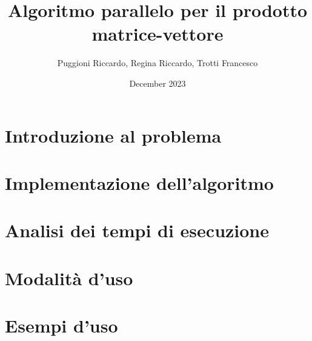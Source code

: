 \documentclass{article}
\title{Algoritmo parallelo per il prodotto matrice-vettore}
\author{Puggioni Riccardo, Regina Riccardo, Trotti Francesco }
\date{December 2023}
\begin{document}
\maketitle

\newpage
\tableofcontents

\newpage
\section{Introduzione al problema}
    

\section{Implementazione dell'algoritmo}
    

\section{Analisi dei tempi di esecuzione}


\section{Modalità d'uso}


\section{Esempi d'uso}

\end{document}
